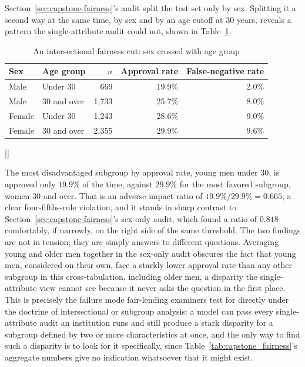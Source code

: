 \documentclass[../ai_in_finance]{subfiles}
\begin{document}
Section~\ref{sec:capstone-fairness}'s audit split the test set only by sex. Splitting it a second way at the same time, by sex and by an age cutoff at 30 years, reveals a pattern the single-attribute audit could not, shown in Table~\ref{tab:capstone_intersectional}.

\begin{table}[htbp]
\centering
\begin{lrbox}{\bookmeasuredbox}
\begin{tabular}{llrrr}
\toprule
Sex & Age group & $n$ & Approval rate & False-negative rate \\
\midrule
Male & Under 30 & 669 & 19.9\% & 2.0\% \\
Male & 30 and over & 1{,}733 & 25.7\% & 8.0\% \\
Female & Under 30 & 1{,}243 & 28.6\% & 9.0\% \\
Female & 30 and over & 2{,}355 & 29.9\% & 9.6\% \\
\bottomrule
\end{tabular}
\end{lrbox}
\ifdim\wd\bookmeasuredbox<0.65\linewidth
\setlength{\bookcapwidth}{0.65\linewidth}
\else
\setlength{\bookcapwidth}{\wd\bookmeasuredbox}
\fi
{}[\bookcapwidth]{
\usebox{\bookmeasuredbox}
}{
\caption{An intersectional fairness cut: sex crossed with age group}
\label{tab:capstone_intersectional}
}
\end{table}

The most disadvantaged subgroup by approval rate, young men under 30, is approved only $19.9\%$ of the time, against $29.9\%$ for the most favored subgroup, women 30 and over. That is an adverse impact ratio of $19.9\%/29.9\% = 0.665$, a clear four-fifths-rule violation, and it stands in sharp contrast to Section~\ref{sec:capstone-fairness}'s sex-only audit, which found a ratio of $0.818$ comfortably, if narrowly, on the right side of the same threshold. The two findings are not in tension; they are simply answers to different questions. Averaging young and older men together in the sex-only audit obscures the fact that young men, considered on their own, face a starkly lower approval rate than any other subgroup in this cross-tabulation, including older men, a disparity the single-attribute view cannot see because it never asks the question in the first place. This is precisely the failure mode fair-lending examiners test for directly under the doctrine of intersectional or subgroup analysis: a model can pass every single-attribute audit an institution runs and still produce a stark disparity for a subgroup defined by two or more characteristics at once, and the only way to find such a disparity is to look for it specifically, since Table~\ref{tab:capstone_fairness}'s aggregate numbers give no indication whatsoever that it might exist.
\end{document}
